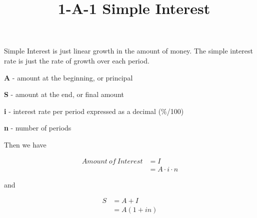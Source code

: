 \documentclass{article}
\title{\normalfont\ 1-A-1 Simple Interest} %
\date{}  %
\begin{document}
    \maketitle %

    \begin{flushleft}
        Simple Interest is just linear growth in the amount of money.  The simple interest rate is just the rate of growth over each period.
    \end{flushleft}

    \begin{description}
        \item\textbf{A} - amount at the beginning, or principal
        \item\textbf{S} - amount at the end, or final amount
        \item\textbf{i} - interest rate per period expressed as a decimal {(\%/100)}
        \item\textbf{n} - number of periods
    \end{description}


    \begin{flushleft}
        Then we have
    \end{flushleft}

    \begin{align*}
        Amount \: of \: Interest & = I \\
        & = A \cdot i \cdot n
    \end{align*}

    \begin{flushleft}
        and
    \end{flushleft}

    \begin{align*}
        S & = A + I \\
        & = A(1 + in)
    \end{align*} \\
\end{document}

